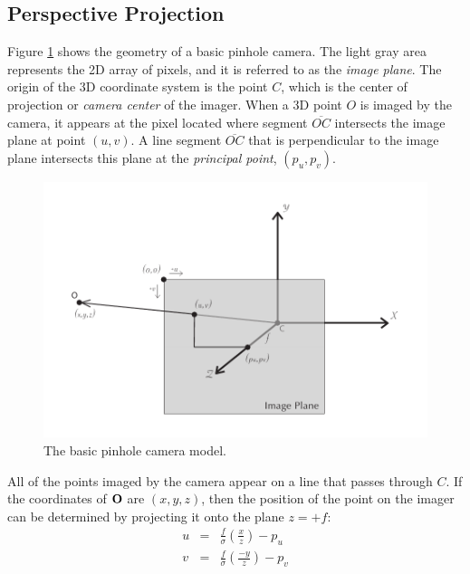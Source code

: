 \subsection{Perspective Projection}

Figure \ref{fig:pinhole-camera-diagram} shows the geometry of a basic
pinhole camera.  The light gray area represents the 2D array of
pixels, and it is referred to as the {\em image plane}.  The origin of
the 3D coordinate system is the point $C$, which is the center of
projection or {\em camera center} of the imager.  When a 3D point $O$
is imaged by the camera, it appears at the pixel located where segment
$\overline{OC}$ intersects the image plane at point $(u,v)$.  A line
segment $\overline{OC}$ that is perpendicular to the image plane
intersects this plane at the {\em principal point}, $(p_u, p_v)$.

\begin{figure}[tbp]
\begin{center}
  \includegraphics[width=6in]{images/camera_module_pinhole.pdf}
 \end{center}
  \caption{The basic pinhole camera model.}
  \label{fig:pinhole-camera-diagram}
\end{figure}

All of the points imaged by the camera appear on a line that passes
through $C$.  If the coordinates of ${\bf O}$ are $(x,y,z)$, then the
position of the point on the imager can be determined by projecting it
onto the plane $ z = +f$:
\begin{eqnarray}
\label{eqn:forward-projection-1}
u &=& \frac{f}{\sigma} \left(\frac{x}{z}\right) - p_u \\
\label{eqn:forward-projection-2}
v &=& \frac{f}{\sigma} \left(\frac{-y}{z}\right) - p_v
\end{eqnarray}

